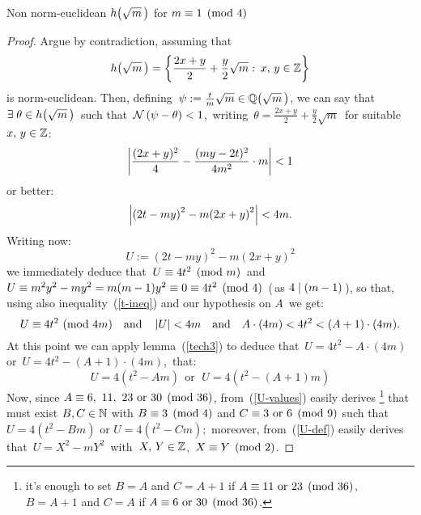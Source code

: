 \begin{subsection}{Non norm-euclidean $\hh{m}$ for $m\equiv 1 \pmod 4$}
\begin{proof}
Argue by contradiction, assuming that 
$$\hh{m} = 
  \left\{
    \frac{2x + y}{2} + \frac{y}{2}\sqrt{m}:\:x,\,y \in \Z
  \right\}$$
is norm-euclidean.
Then, defining \,$\psi := \frac{t}{m}\sqrt{m} \in \QQ{m}$, we can say that
\,$\exists\;\theta \in \hh{m}$\, such that \,$\mathcal{N}\left(\psi - \theta\right) < 1$,\,
\ie writing \,$\theta = \frac{2x + y}{2} + \frac{y}{2}\sqrt{m}$\,
for suitable $x ,\, y \in \mathbb{Z}$:
$$ \left|\frac{(2x+y)^2}{4} - \frac{(my-2t)^2}{4m^2} \cdot m\right| < 1 $$
or better:
\begin{equation}\label{t-ineq}
\left| {(2t - my)}^2 - m {(2x + y)}^2 \right| < 4m.
\end{equation}
Writing now:
\begin{equation}\label{U-def}
U := {(2t - my)}^2 - m {(2x + y)}^2
\end{equation}
we immediately deduce that \,$U \equiv 4t^2 \pmod m$\, and
\,$U \equiv m^2 y^2 - m y^2 = m (m - 1) y^2 \equiv 0
\equiv 4t^2 \pmod 4$\, (\,as $4 \mid (m - 1)$\,), so that,
using also inequality~(\ref{t-ineq}) and our hypothesis on $A$\,
we get:
$$
  U \congruent 4t^2\ (\mathrm{mod}\ 4m)%
  ~~~\text{and}~~~%
  \abs{U} < 4m%
  ~~~\text{and}~~~%
  A \cdot (4m) < 4t^2 < (A+1) \cdot (4m).
$$
At this point we can apply lemma~(\ref{tech3}) to deduce that\,
$U = 4t^2 - A\cdot(4m)$\, or\, $U = 4t^2 - (A+1)\cdot(4m)$,\, \ie
that:
\begin{equation}\label{U-values}
U = 4\left(t^2 - A m\right)
~~\text{or}~~\,
U = 4\left(t^2 - (A+1) m\right)
\end{equation}
Now, since $A \equiv 6,~11,~23~\text{or}~30 \pmod{36}$,
from~(\ref{U-values}) easily derives%
\footnote{it's enough to set $B = A$ and $C = A + 1$ if
$A \equiv 11 \text{ or } 23 \pmod{36}$,\, $B = A + 1$ and
$C = A$ if $A \equiv 6 \text{ or } 30 \pmod{36}$.}
that must exist $B, C \in \mathbb{N}$ with $B \equiv 3 \pmod 4$ and
$C \equiv 3 \text{ or } 6 \pmod 9$ such that $U = 4(t^2 - B m)$
or $U = 4(t^2 - C m)$;\,
moreover, from~(\ref{U-def}) easily derives that\,
$U = X^2 - m Y^2$\, with\, $X,\,Y\in\mathbb{Z}$,\, $X \equiv Y \pmod 2$.


\end{proof}
\end{subsection}
